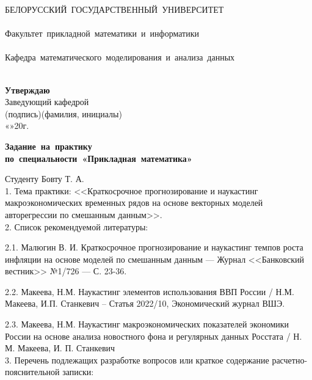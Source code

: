 \documentclass[a4paper, 14pt]{extreport}
\numberwithin{equation}{section}
\numberwithin{equation}{section}
\begin{document}
	\begin{center}
		{
			\mbox{БЕЛОРУССКИЙ~ГОСУДАРСТВЕННЫЙ~УНИВЕРСИТЕТ} \\~\\
			\mbox{Факультет~прикладной математики~и~информатики} \\~\\
			\mbox{Кафедра~математического~моделирования~и~анализа~данных} \\~\\[2mm]
		}
		\vspace{0.5cm}
		\hfill
		\begin{minipage}{.6\textwidth}
			\begin{flushright}
				\textbf{Утверждаю}\hspace*{4.2cm} \\
				Заведующий кафедрой \underline{\hspace*{4cm}}\\[-2mm]
				{\scriptsize(подпись)(фамилия, инициалы)}\\[2ex]
				«\underline{\hspace*{0.5cm}}»\underline{\hspace*{2cm}}20\underline{\hspace*{0.5cm}}г.
				
			\end{flushright}
		\end{minipage}
		
		\vspace{1cm}
		\bf
		{
			\mbox{Задание на практику}\\
			\mbox{по специальности «Прикладная математика»} \\[6mm]
		}
	\end{center}
	Студенту Бовту Т. А.\\[2mm]
	1. Тема практики:
	<<Краткосрочное прогнозирование и наукастинг макроэкономических временных рядов на основе векторных моделей авторегрессии по смешанным данным>>.\\[6mm]
	2. Список рекомендуемой литературы:
	
	2.1. Малюгин В. И. Краткосрочное прогнозирование и наукастинг темпов роста инфляции на основе моделей по смешанным данным --- Журнал <<Банковский вестник>> №1/726 --- С. 23-36.
	
	2.2. Макеева, Н.М. Наукастинг элементов использования ВВП России / Н.М. Макеева, И.П. Станкевич -- Статья 2022/10, Экономический журнал ВШЭ.
	
	2.3. Макеева, Н.М. Наукастинг макроэкономических показателей экономики России на основе анализа новостного фона и регулярных данных Росстата / Н. М. Макеева, И. П. Станкевич\\[6mm]
	3. Перечень подлежащих разработке вопросов или краткое содержание
	расчетно-пояснительной записки:
	
\end{document}
